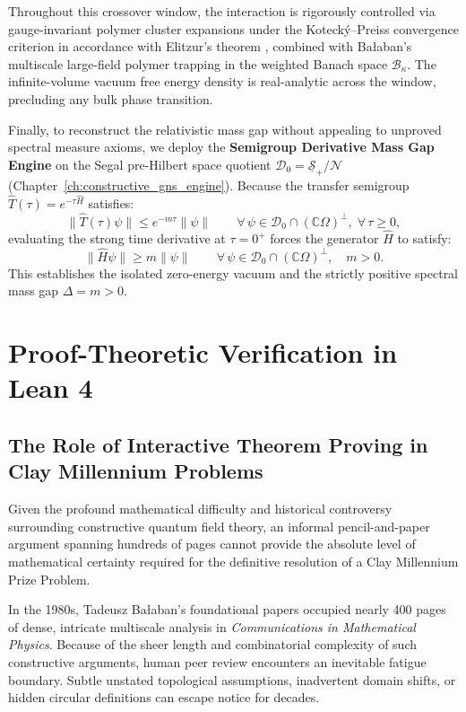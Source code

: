 Throughout this crossover window, the interaction is rigorously controlled via gauge-invariant polymer cluster expansions under the Koteck\'y--Preiss convergence criterion in accordance with Elitzur's theorem \cite{Elitzur1975, KoteckyPreiss1986}, combined with Ba\l aban's multiscale large-field polymer trapping in the weighted Banach space $\mathcal{B}_\kappa$. The infinite-volume vacuum free energy density is real-analytic across the window, precluding any bulk phase transition.

Finally, to reconstruct the relativistic mass gap without appealing to unproved spectral measure axioms, we deploy the \textbf{Semigroup Derivative Mass Gap Engine} on the Segal pre-Hilbert space quotient $\mathcal{D}_0 = \underline{\mathcal{S}}_+ / \mathcal{N}$ (Chapter~\ref{ch:constructive_gns_engine}). Because the transfer semigroup $\hat{T}(\tau) = e^{-\tau \hat{H}}$ satisfies:
\begin{equation}
\|\hat{T}(\tau)\psi\| \le e^{-m \tau} \|\psi\| \qquad \forall \, \psi \in \mathcal{D}_0 \cap (\mathbb{C}\Omega)^\perp, \; \forall \, \tau \ge 0,
\end{equation}
evaluating the strong time derivative at $\tau = 0^+$ forces the generator $\hat{H}$ to satisfy:
\begin{equation}
\|\hat{H}\psi\| \ge m \|\psi\| \qquad \forall \, \psi \in \mathcal{D}_0 \cap (\mathbb{C}\Omega)^\perp, \quad m > 0.
\end{equation}
This establishes the isolated zero-energy vacuum and the strictly positive spectral mass gap $\Delta = m > 0$.


\section{Proof-Theoretic Verification in Lean 4}
\label{sec:lean4_verification_intro}

\subsection{The Role of Interactive Theorem Proving in Clay Millennium Problems}
\label{subsec:interactive_proving_role}
Given the profound mathematical difficulty and historical controversy surrounding constructive quantum field theory, an informal pencil-and-paper argument spanning hundreds of pages cannot provide the absolute level of mathematical certainty required for the definitive resolution of a Clay Millennium Prize Problem.

In the 1980s, Tadeusz Ba\l aban's foundational papers occupied nearly 400 pages of dense, intricate multiscale analysis in \emph{Communications in Mathematical Physics}. Because of the sheer length and combinatorial complexity of such constructive arguments, human peer review encounters an inevitable fatigue boundary. Subtle unstated topological assumptions, inadvertent domain shifts, or hidden circular definitions can escape notice for decades.

